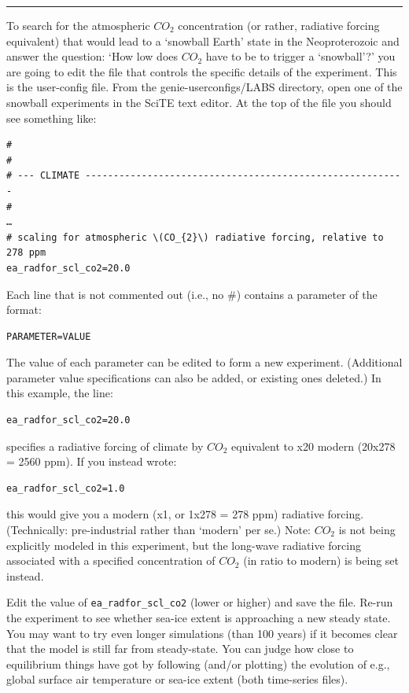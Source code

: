 \documentclass[11pt,fleqn]{book} %
\begin{document}
\hfill \break
\noindent\rule{4cm}{0.1mm}
\hfill \break

To search for the atmospheric \(CO_{2}\) concentration (or rather, radiative forcing equivalent) that would lead to a ‘snowball Earth’ state in the Neoproterozoic and answer the question:
‘How low does \(CO_{2}\) have to be to trigger a ‘snowball’?’
you are going to edit the file that controls the specific details of the experiment. This is the user-config file. From the genie-userconfigs/LABS directory, open one of the snowball experiments in the SciTE text editor. At the top of the file you should see something like:

\small\begin{verbatim}
#
#
# --- CLIMATE ---------------------------------------------------------
#
…
# scaling for atmospheric \(CO_{2}\) radiative forcing, relative to 278 ppm
ea_radfor_scl_co2=20.0
\end{verbatim}\normalsize

Each line that is not commented out (i.e., no \#) contains a parameter of the format:
\begin{verbatim}
PARAMETER=VALUE
\end{verbatim}
The value of each parameter can be edited to form a new experiment. (Additional parameter value specifications can also be added, or existing ones deleted.) In this example, the line: 
\begin{verbatim}
ea_radfor_scl_co2=20.0
\end{verbatim}
specifies a radiative forcing of climate by \(CO_{2}\) equivalent to x20 modern (20x278 = 2560 ppm). If you instead wrote: 
\begin{verbatim}
ea_radfor_scl_co2=1.0
\end{verbatim}
this would give you a modern (x1, or 1x278 = 278 ppm) radiative forcing. (Technically: pre-industrial rather than ‘modern’ per se.)
Note: \(CO_{2}\) is not being explicitly modeled in this experiment, but the long-wave radiative forcing associated with a specified concentration of \(CO_{2}\) (in ratio to modern) is being set instead.

Edit the value of \texttt{ea\_radfor\_scl\_co2} (lower or higher) and save the file. Re-run the experiment to see whether sea-ice extent is approaching a new steady state. You may want to try even longer simulations (than 100 years) if it becomes clear that the model is still far from steady-state. You can judge how close to equilibrium things have got by following (and/or plotting) the evolution of e.g., global surface air temperature or sea-ice extent (both time-series files).
\end{document}
